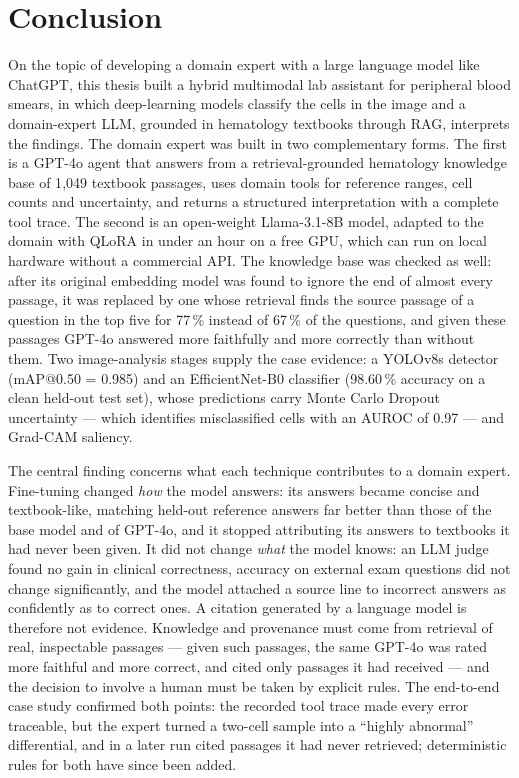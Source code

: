 \section{Conclusion}\label{sec:conclusion}

On the topic of developing a domain expert with a large language model like ChatGPT, this thesis built a hybrid multimodal lab assistant for peripheral blood smears, in which deep-learning models classify the cells in the image and a domain-expert LLM, grounded in hematology textbooks through RAG, interprets the findings. The domain expert was built in two complementary forms. The first is a GPT-4o agent that answers from a retrieval-grounded hematology knowledge base of 1{,}049 textbook passages, uses domain tools for reference ranges, cell counts and uncertainty, and returns a structured interpretation with a complete tool trace. The second is an open-weight Llama-3.1-8B model, adapted to the domain with QLoRA in under an hour on a free GPU, which can run on local hardware without a commercial API. The knowledge base was checked as well: after its original embedding model was found to ignore the end of almost every passage, it was replaced by one whose retrieval finds the source passage of a question in the top five for 77\,\% instead of 67\,\% of the questions, and given these passages GPT-4o answered more faithfully and more correctly than without them. Two image-analysis stages supply the case evidence: a YOLOv8s detector (mAP@0.50 = 0.985) and an EfficientNet-B0 classifier (98.60\,\% accuracy on a clean held-out test set), whose predictions carry Monte Carlo Dropout uncertainty --- which identifies misclassified cells with an AUROC of 0.97 --- and Grad-CAM saliency.

The central finding concerns what each technique contributes to a domain expert. Fine-tuning changed \emph{how} the model answers: its answers became concise and textbook-like, matching held-out reference answers far better than those of the base model and of GPT-4o, and it stopped attributing its answers to textbooks it had never been given. It did not change \emph{what} the model knows: an LLM judge found no gain in clinical correctness, accuracy on external exam questions did not change significantly, and the model attached a source line to incorrect answers as confidently as to correct ones. A citation generated by a language model is therefore not evidence. Knowledge and provenance must come from retrieval of real, inspectable passages --- given such passages, the same GPT-4o was rated more faithful and more correct, and cited only passages it had received --- and the decision to involve a human must be taken by explicit rules. The end-to-end case study confirmed both points: the recorded tool trace made every error traceable, but the expert turned a two-cell sample into a ``highly abnormal'' differential, and in a later run cited passages it had never retrieved; deterministic rules for both have since been added.

